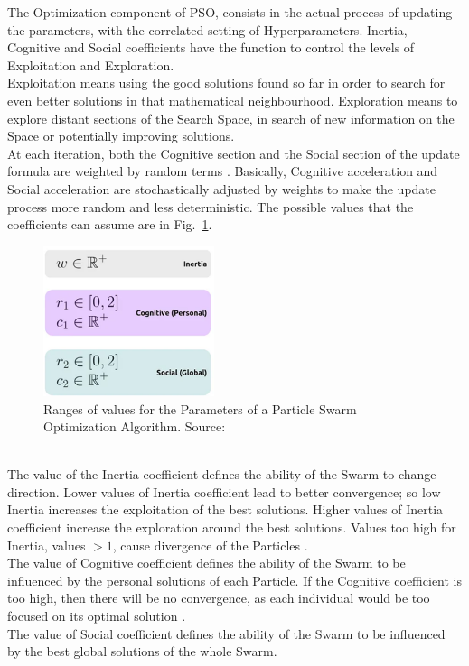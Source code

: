 The Optimization component of PSO, consists in the actual process of updating the parameters, with the correlated setting of Hyperparameters.
Inertia, Cognitive and Social coefficients have the function to control the levels of Exploitation and Exploration.
\\[0.3cm]Exploitation means using the good solutions found so far in order to search for even better solutions in that mathematical neighbourhood. Exploration means to explore distant sections of the Search Space, in search of new information on the Space or potentially improving solutions.
% 
\\[0.3cm]At each iteration, both the Cognitive section and the Social section of the update formula are weighted by random terms \cite{Tesi-3.2} \cite{Tesi-3.5}.
Basically, Cognitive acceleration and Social acceleration are stochastically adjusted by weights to make the update process more random and less deterministic. The possible values that the coefficients can assume are in Fig.~\ref{fig:figure-3.1.3}.
\begin{figure}[t]
	\centering
	\includegraphics[width=5cm]{figures/figure-3.1.3.png}
	\caption[Values Ranges for PSO Parameters]{Ranges of values for the Parameters of a Particle Swarm Optimization Algorithm. Source:~\cite{Tesi-3.2}}
	\label{fig:figure-3.1.3}
\end{figure}
% 
\\[0.3cm]The value of the Inertia coefficient defines the ability of the Swarm to change direction.
Lower values of Inertia coefficient lead to better convergence; so low Inertia increases the exploitation of the best solutions.
Higher values of Inertia coefficient increase the exploration around the best solutions.
Values too high for Inertia, values $>1$, cause divergence of the Particles \cite{Tesi-3.2}.
% 
\\[0.3cm]The value of Cognitive coefficient defines the ability of the Swarm to be influenced by the personal solutions of each Particle.
If the Cognitive coefficient is too high, then there will be no convergence, as each individual would be too focused on its optimal solution \cite{Tesi-3.2}.
% 
\\[0.3cm]The value of Social coefficient defines the ability of the Swarm to be influenced by the best global solutions of the whole Swarm.

